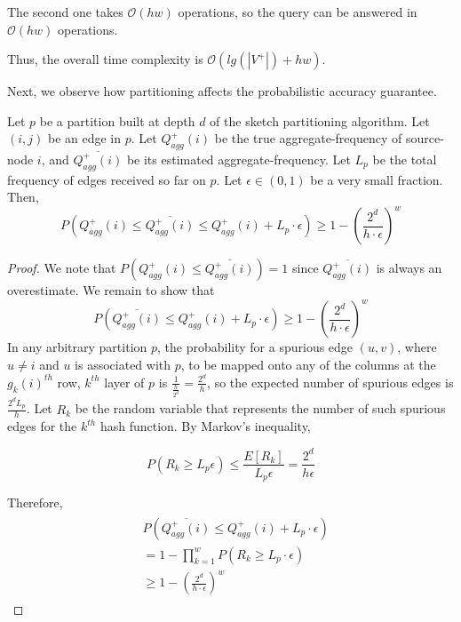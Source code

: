 The second one takes $\mathcal{O}(hw)$ operations, so the query can be answered in $\mathcal{O}(hw)$ operations.

Thus, the overall time complexity is $\mathcal{O}(lg(|V^{+}|) + hw)$.

Next, we observe how partitioning affects the probabilistic accuracy guarantee.

\begin{theorem}
\label{thm:agg1}
Let $p$ be a partition built at depth $d$ of the sketch partitioning algorithm. Let $(i,j)$ be an edge in $p$. Let $Q_{agg}^{+}(i)$ be the true aggregate-frequency of source-node $i$, and $\overline{Q_{agg}^{+}(i)}$ be its estimated aggregate-frequency. Let $L_p$ be the total frequency of edges received so far on $p$. Let $\epsilon \in (0,1)$ be a very small fraction. Then,
\[
P(Q_{agg}^{+}(i) \leq \overline{Q_{agg}^{+}(i)} \leq Q_{agg}^{+}(i) + L_p \cdot \epsilon) \geq 1-(\frac{2^d}{h\cdot\epsilon})^w
\]
\end{theorem}

\begin{proof}
We note that $P(Q_{agg}^{+}(i) \leq \overline{Q_{agg}^{+}(i)}) = 1$ since $\overline{Q_{agg}^{+}(i)}$ is always an overestimate. We remain to show that
\[
P(\overline{Q_{agg}^{+}(i)} \leq Q_{agg}^{+}(i) + L_p \cdot \epsilon) \geq 1-(\frac{2^d}{h\cdot\epsilon})^w
\]
In any arbitrary partition $p$, the probability for a spurious edge $(u,v)$, where $u \neq i$ and $u$ is associated with $p$, to be mapped onto any of the columns at the $g_k(i)^{th}$ row, $k^{th}$ layer of $p$ is $\frac{1}{\frac{h}{2^d}} = \frac{2^d}{h}$, so the expected number of spurious edges is $\frac{2^dL_p}{h}$. Let $R_k$ be the random variable that represents the number of such spurious edges for the $k^{th}$ hash function. By Markov's inequality,

\begin{equation} \label{agg21}
  P(R_k \geq L_p \epsilon) \leq \frac{E[R_k]}{L_p \epsilon} = \frac{2^d}{h\epsilon}
\end{equation}

Therefore,
\begin{align}
\begin{split}
&  P(\overline{Q_{agg}^{+}(i)} \leq Q_{agg}^{+}(i) + L_p \cdot \epsilon)
\\  &= 1 - \prod _{k=1}^{w}P(R_k \geq L_p \cdot \epsilon)
\\  &\geq 1-(\frac{2^d}{h\cdot\epsilon})^w
\end{split}
\end{align}

\end{proof}

